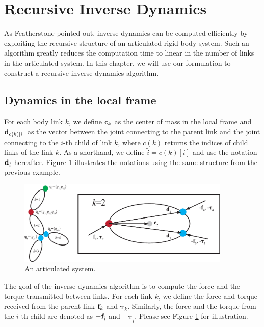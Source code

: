\section{Recursive Inverse Dynamics}
\label{sec:invdyn}
As Featherstone pointed out, inverse dynamics can be computed
efficiently by exploiting the recursive structure of an articulated
rigid body system. Such an algorithm greatly reduces the computation
time to linear in the number of links in the articulated system. In
this chapter, we will use our formulation to construct a recursive
inverse dynamics algorithm.

\subsection{Dynamics in the local frame}
For each body link $k$, we define $\mathbf{c}_k$ as the center of mass in
the local frame and $\mathbf{d}_{c(k)[i]}$ as the vector between the joint
connecting to the parent link and the joint connecting to the $i$-th child of
link $k$, where $c(k)$ returns the indices of child links of the link
$k$. As a shorthand, we define $\tilde{i} = c(k)[i]$ and use the
notation $\mathbf{d}_{\tilde{i}}$ hereafter.  Figure \ref{fig:example2}
illustrates the notations using the same structure from the previous
example.

\begin{figure}
 \vspace{20pt}
\begin{center}
\includegraphics[width=4in]{example2.eps}
\end{center}
\caption{An articulated system.}
 \vspace{0pt}
\label{fig:example2}
\end{figure}

The goal of the inverse dynamics algorithm is to compute the force and
the torque transmitted between links. For each link $k$, we define the
force and torque received from the parent link $\mathbf{f}_k$ and
$\bm{\tau}_k$. Similarly, the force and the torque from the $i$-th
child are denoted as $-\mathbf{f}_{\tilde{i}}$ and
$-\bm{\tau}_{\tilde{i}}$. Please see Figure \ref{fig:example2} for illustration.

